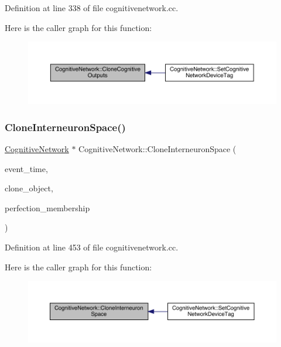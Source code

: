 Definition at line 338 of file cognitivenetwork.\+cc.

Here is the caller graph for this function\+:
\nopagebreak
\begin{figure}[H]
\begin{center}
\leavevmode
\includegraphics[width=350pt]{class_cognitive_network_a5734aa5378e9b701dca5e98017c1ea35_icgraph}
\end{center}
\end{figure}
\mbox{\label{class_cognitive_network_a1eef76439fffb9daaa3edc4e3c012831}} 
\subsubsection{\texorpdfstring{Clone\+Interneuron\+Space()}{CloneInterneuronSpace()}}
{\footnotesize\ttfamily \hyperlink{class_cognitive_network}{Cognitive\+Network} $\ast$ Cognitive\+Network\+::\+Clone\+Interneuron\+Space (\begin{DoxyParamCaption}\item[{std\+::chrono\+::time\+\_\+point$<$ \hyperlink{universe_8h_a0ef8d951d1ca5ab3cfaf7ab4c7a6fd80}{Clock} $>$}]{event\+\_\+time,  }\item[{\hyperlink{class_cognitive_network}{Cognitive\+Network} $\ast$}]{clone\+\_\+object,  }\item[{double}]{perfection\+\_\+membership }\end{DoxyParamCaption})}



Definition at line 453 of file cognitivenetwork.\+cc.

Here is the caller graph for this function\+:
\nopagebreak
\begin{figure}[H]
\begin{center}
\leavevmode
\includegraphics[width=350pt]{class_cognitive_network_a1eef76439fffb9daaa3edc4e3c012831_icgraph}
\end{center}
\end{figure}
\mbox{\label{class_cognitive_network_a5ee1d7b6df5bfe0048b4aea317c1974c}} 
